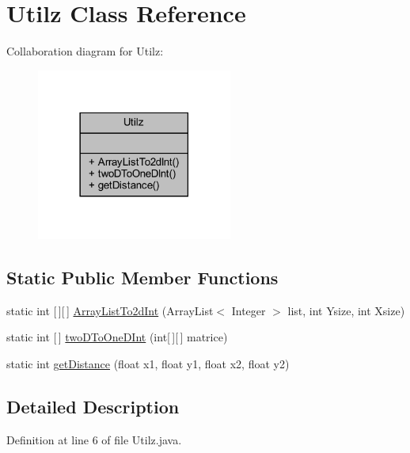 \hypertarget{classhelpz_1_1_utilz}{}\section{Utilz Class Reference}
\label{classhelpz_1_1_utilz}


Collaboration diagram for Utilz\+:\nopagebreak
\begin{figure}[H]
\begin{center}
\leavevmode
\includegraphics[width=182pt]{classhelpz_1_1_utilz__coll__graph}
\end{center}
\end{figure}
\subsection*{Static Public Member Functions}
\begin{DoxyCompactItemize}
\item 
static int \mbox{[}$\,$\mbox{]}\mbox{[}$\,$\mbox{]} \hyperlink{classhelpz_1_1_utilz_a3f701300276e5102efe8c55e65192dec}{Array\+List\+To2d\+Int} (Array\+List$<$ Integer $>$ list, int Ysize, int Xsize)
\item 
static int \mbox{[}$\,$\mbox{]} \hyperlink{classhelpz_1_1_utilz_a3a92fdb2e1e33fa3daadbdea23200fcc}{two\+D\+To\+One\+D\+Int} (int\mbox{[}$\,$\mbox{]}\mbox{[}$\,$\mbox{]} matrice)
\item 
static int \hyperlink{classhelpz_1_1_utilz_a8a4c702547acd44cb113b787ae1d3e05}{get\+Distance} (float x1, float y1, float x2, float y2)
\end{DoxyCompactItemize}


\subsection{Detailed Description}


Definition at line 6 of file Utilz.\+java.



